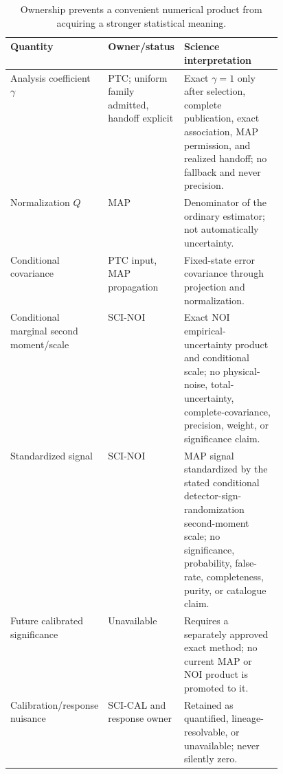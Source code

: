 \documentclass[10pt]{article}
\begin{document}
\begin{table}[h]
\centering\small
\begin{tabularx}{\linewidth}{@{}L{0.26\linewidth}L{0.20\linewidth}Y@{}}
\toprule Quantity & Owner/status & Science interpretation \\
\midrule
Analysis coefficient \(\gamma\) & PTC; uniform family admitted, handoff explicit & Exact \(\gamma=1\) only after selection, complete publication, exact association, MAP permission, and realized handoff; no fallback and never precision.\\
Normalization \(Q\) & MAP & Denominator of the ordinary estimator; not automatically uncertainty.\\
Conditional covariance & PTC input, MAP propagation & Fixed-state error covariance through projection and normalization.\\
Conditional marginal second moment/scale & SCI-NOI & Exact NOI empirical-
uncertainty product and conditional scale; no physical-noise, total-
uncertainty, complete-covariance, precision, weight, or significance claim.\\
Standardized signal & SCI-NOI & MAP signal standardized by the stated
conditional detector-sign-randomization second-moment scale; no significance,
probability, false-rate, completeness, purity, or catalogue claim.\\
Future calibrated significance & Unavailable & Requires a separately approved
exact method; no current MAP or NOI product is promoted to it.\\
Calibration/response nuisance & SCI-CAL and response owner & Retained as quantified, lineage-resolvable, or unavailable; never silently zero.\\
\bottomrule
\end{tabularx}
\caption{Ownership prevents a convenient numerical product from acquiring a stronger statistical meaning.}
\end{table}

\clearpage
\end{document}
